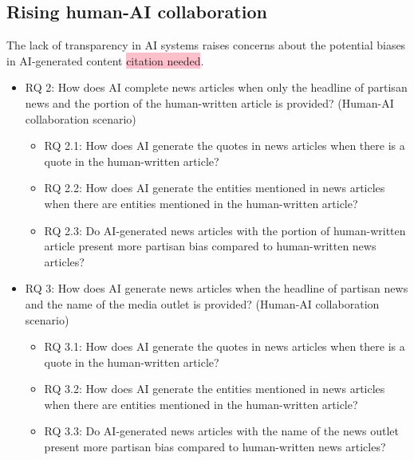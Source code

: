\documentclass[]{interact}
\theoremstyle{plain}%
\theoremstyle{definition}
\theoremstyle{remark}
\begin{document}
\subsection{Rising human-AI collaboration}

The lack of transparency in AI systems raises concerns about the potential biases in AI-generated content \colorbox{pink}{citation needed}. 

\begin{itemize}
  \item RQ 2: How does AI complete news articles when only the headline of partisan news and the portion of the human-written article is provided? (Human-AI collaboration scenario)
  \begin{itemize}
    \item RQ 2.1: How does AI generate the quotes in news articles when there is a quote in the human-written article?
    \item RQ 2.2: How does AI generate the entities mentioned in news articles when there are entities mentioned in the human-written article?
    \item RQ 2.3: Do AI-generated news articles with the portion of human-written article present more partisan bias compared to human-written news articles?
  \end{itemize}
\end{itemize}

\begin{itemize}
  \item RQ 3: How does AI generate news articles when the headline of partisan news and the name of the media outlet is provided? (Human-AI collaboration scenario)
  \begin{itemize}
    \item RQ 3.1: How does AI generate the quotes in news articles when there is a quote in the human-written article?
    \item RQ 3.2: How does AI generate the entities mentioned in news articles when there are entities mentioned in the human-written article?
    \item RQ 3.3: Do AI-generated news articles with the name of the news outlet present more partisan bias compared to human-written news articles?
  \end{itemize}
\end{itemize}



\end{document}
